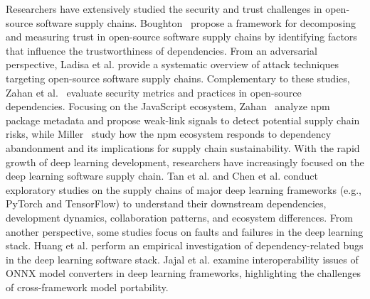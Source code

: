 Researchers have extensively studied the security and trust challenges in open-source software supply chains. Boughton~\cite{boughton2024decomposing} propose a framework for decomposing and measuring trust in open-source software supply chains by identifying factors that influence the trustworthiness of dependencies. From an adversarial perspective, Ladisa et al.\cite{ladisa2023sok} provide a systematic overview of attack techniques targeting open-source software supply chains. Complementary to these studies, Zahan et al.~\cite{zahan2023software} evaluate security metrics and practices in open-source dependencies. Focusing on the JavaScript ecosystem, Zahan~\cite{zahan2022weak} analyze npm package metadata and propose weak-link signals to detect potential supply chain risks, while Miller~\cite{miller2025understanding} study how the npm ecosystem responds to dependency abandonment and its implications for supply chain sustainability. With the rapid growth of deep learning development, researchers have increasingly focused on the deep learning software supply chain. Tan et al.\cite{tan2022exploratory, gao2024characterizing} and Chen et al.\cite{chen2025understanding} conduct exploratory studies on the supply chains of major deep learning frameworks (e.g., PyTorch and TensorFlow) to understand their downstream dependencies, development dynamics, collaboration patterns, and ecosystem differences. From another perspective, some studies focus on faults and failures in the deep learning stack. Huang et al.\cite{huang2023demystifying} perform an empirical investigation of dependency-related bugs in the deep learning software stack. Jajal et al.\cite{jajal2024interoperability} examine interoperability issues of ONNX model converters in deep learning frameworks, highlighting the challenges of cross-framework model portability.


